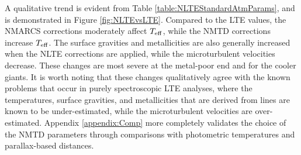 \documentclass[preprint]{aastex61}
\begin{document}
A qualitative trend is evident from Table
\ref{table:NLTEStandardAtmParams}, and is demonstrated in Figure
\ref{fig:NLTEvsLTE}.  Compared to the LTE values, the NMARCS
corrections moderately affect $T_{\rm{eff}}$, while the NMTD
corrections increase $T_{\rm{eff}}$.  The surface gravities
and metallicities are also generally increased when the NLTE
corrections are applied, while the microturbulent velocities decrease.
These changes are most  severe at the metal-poor end and for the
cooler giants.  It is worth noting that these changes qualitatively
agree with the known problems that occur in purely spectroscopic LTE
analyses, where the temperatures, surface gravities, and metallicities
that are derived from  lines are known to be
under-estimated, while the microturbulent velocities are
over-estimated.  Appendix \ref{appendix:Comp} more completely
validates the choice of the NMTD parameters through comparisons with
photometric temperatures and parallax-based distances.
\end{document}

